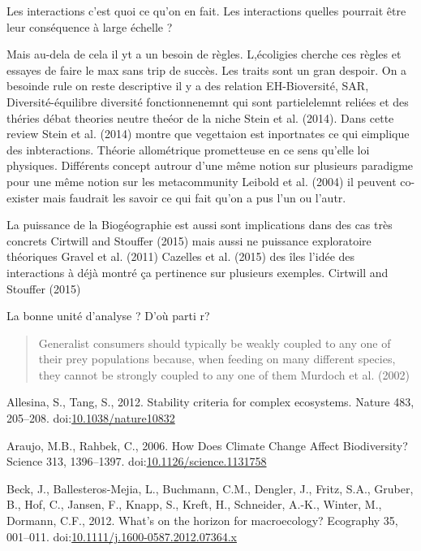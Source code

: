 Les interactions c'est quoi ce qu'on en fait. Les interactions quelles
pourrait être leur conséquence à large échelle ?

Mais au-dela de cela il yt a un besoin de règles. L,écoligies cherche
ces règles et essayes de faire le max sans trip de succès. Les traits
sont un gran despoir. On a besoinde rule on reste descriptive il y a des
relation EH-Bioversité, SAR, Diversité-équilibre diversité
fonctionnenemnt qui sont partielelemnt reliées et des théries débat
theories neutre theéor de la niche Stein et al. (2014). Dans cette
review Stein et al. (2014) montre que vegettaion est inportnates ce qui
eimplique des inbteractions. Théorie allométrique prometteuse en ce sens
qu'elle loi physiques. Différents concept autrour d'une même notion sur
plusieurs paradigme pour une même notion sur les metacommunity Leibold
et al. (2004) il peuvent co-exister mais faudrait les savoir ce qui fait
qu'on a pus l'un ou l'autr.

La puissance de la Biogéographie est aussi sont implications dans des
cas très concrets Cirtwill and Stouffer (2015) mais aussi ne puissance
exploratoire théoriques Gravel et al. (2011) Cazelles et al. (2015) des
îles l'idée des interactions à déjà montré ça pertinence sur plusieurs
exemples. Cirtwill and Stouffer (2015)

La bonne unité d'analyse ? D'où parti r?

\begin{quote}
Generalist consumers should typically be weakly coupled to any one of
their prey populations because, when feeding on many different species,
they cannot be strongly coupled to any one of them Murdoch et al. (2002)
\end{quote}

\hypertarget{refs}{}
\hypertarget{ref-Allesina2012a}{}
Allesina, S., Tang, S., 2012. Stability criteria for complex ecosystems.
Nature 483, 205--208.
doi:\href{https://doi.org/10.1038/nature10832}{10.1038/nature10832}

\hypertarget{ref-Araujo2006}{}
Araujo, M.B., Rahbek, C., 2006. How Does Climate Change Affect
Biodiversity? Science 313, 1396--1397.
doi:\href{https://doi.org/10.1126/science.1131758}{10.1126/science.1131758}

\hypertarget{ref-Beck2012}{}
Beck, J., Ballesteros-Mejia, L., Buchmann, C.M., Dengler, J., Fritz,
S.A., Gruber, B., Hof, C., Jansen, F., Knapp, S., Kreft, H., Schneider,
A.-K., Winter, M., Dormann, C.F., 2012. What's on the horizon for
macroecology? Ecography 35, 001--011.
doi:\href{https://doi.org/10.1111/j.1600-0587.2012.07364.x}{10.1111/j.1600-0587.2012.07364.x}

